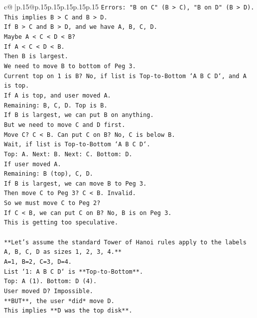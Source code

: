 \documentclass{article}
\begin{document}
{\begin{supertabular}{c@{$\;$}|p{.15\linewidth}@{}p{.15\linewidth}p{.15\linewidth}p{.15\linewidth}p{.15\linewidth}p{.15\linewidth}}
{{{\texttt{Errors: "B on C" (B > C), "B on D" (B > D).} \\
\texttt{This implies B > C and B > D.} \\
\texttt{If B > C and B > D, and we have A, B, C, D.} \\
\texttt{Maybe A < C < D < B?} \\
\texttt{If A < C < D < B.} \\
\texttt{Then B is largest.} \\
\texttt{We need to move B to bottom of Peg 3.} \\
\texttt{Current top on 1 is B? No, if list is Top{-}to{-}Bottom `A B C D`, and A is top.} \\
\texttt{If A is top, and user moved A.} \\
\texttt{Remaining: B, C, D. Top is B.} \\
\texttt{If B is largest, we can put B on anything.} \\
\texttt{But we need to move C and D first.} \\
\texttt{Move C? C < B. Can put C on B? No, C is below B.} \\
\texttt{Wait, if list is Top{-}to{-}Bottom `A B C D`.} \\
\texttt{Top: A. Next: B. Next: C. Bottom: D.} \\
\texttt{If user moved A.} \\
\texttt{Remaining: B (top), C, D.} \\
\texttt{If B is largest, we can move B to Peg 3.} \\
\texttt{Then move C to Peg 3? C < B. Invalid.} \\
\texttt{So we must move C to Peg 2?} \\
\texttt{If C < B, we can put C on B? No, B is on Peg 3.} \\
\texttt{This is getting too speculative.} \\
\\ 
\texttt{**Let's assume the standard Tower of Hanoi rules apply to the labels A, B, C, D as sizes 1, 2, 3, 4.**} \\
\texttt{A=1, B=2, C=3, D=4.} \\
\texttt{List `1: A B C D` is **Top{-}to{-}Bottom**.} \\
\texttt{Top: A (1). Bottom: D (4).} \\
\texttt{User moved D? Impossible.} \\
\texttt{**BUT**, the user *did* move D.} \\
\texttt{This implies **D was the top disk**.} \\
}}}
\end{supertabular}}
\end{document}
